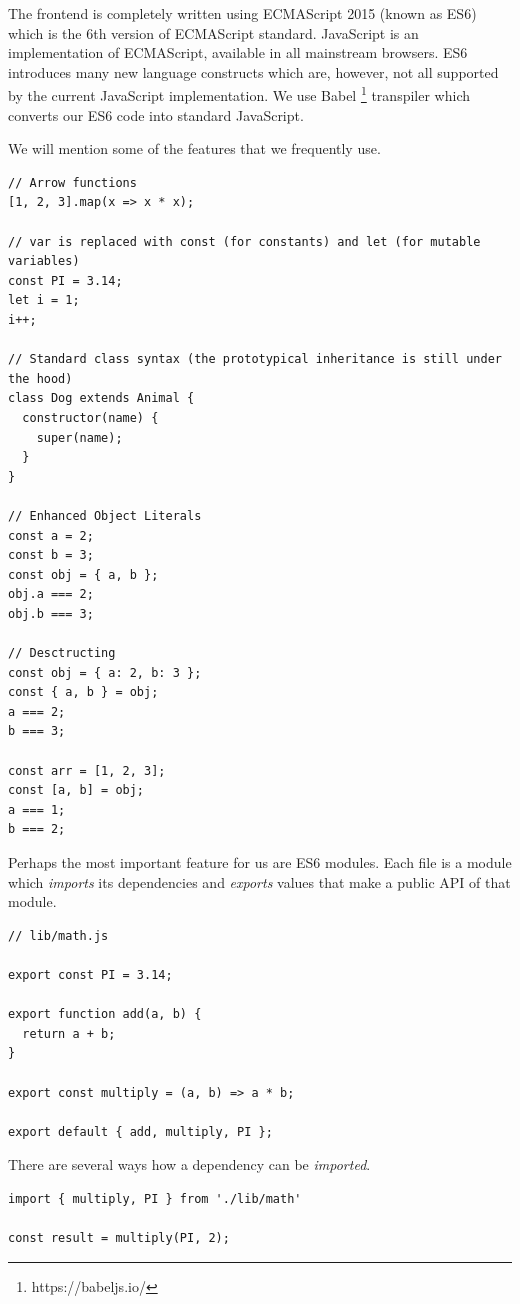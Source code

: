 The frontend is completely written using ECMAScript 2015 (known as ES6) which is the 6th version of ECMAScript standard. JavaScript is an implementation of ECMAScript, available in all mainstream browsers. ES6 introduces many new language constructs which are, however, not all supported by the current JavaScript implementation. We use Babel \footnote{https://babeljs.io/} transpiler which converts our ES6 code into standard JavaScript.

We will mention some of the features that we frequently use.

\begin{verbatim}
// Arrow functions
[1, 2, 3].map(x => x * x);

// var is replaced with const (for constants) and let (for mutable variables)
const PI = 3.14;
let i = 1;
i++;

// Standard class syntax (the prototypical inheritance is still under the hood)
class Dog extends Animal {
  constructor(name) {
    super(name);
  }
}

// Enhanced Object Literals
const a = 2;
const b = 3;
const obj = { a, b };
obj.a === 2;
obj.b === 3;

// Desctructing
const obj = { a: 2, b: 3 };
const { a, b } = obj;
a === 2;
b === 3;

const arr = [1, 2, 3];
const [a, b] = obj;
a === 1;
b === 2;
\end{verbatim}

Perhaps the most important feature for us are ES6 modules. Each file is a module which \emph{imports} its dependencies and \emph{exports} values that make a public API of that module.

\begin{verbatim}
// lib/math.js

export const PI = 3.14;

export function add(a, b) {
  return a + b;
}

export const multiply = (a, b) => a * b;

export default { add, multiply, PI };
\end{verbatim}

There are several ways how a dependency can be \emph{imported}.

\begin{verbatim}
import { multiply, PI } from './lib/math'

const result = multiply(PI, 2);
\end{verbatim}

